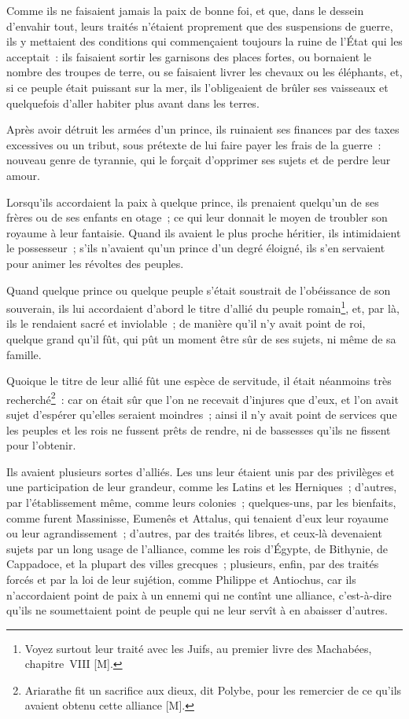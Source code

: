 \documentclass[french,twoside]{book} %
\begin{document}
Comme ils ne faisaient jamais la paix de bonne foi, et que, dans le dessein d’envahir tout, leurs traités n’étaient proprement que des suspensions de guerre, ils y mettaient des conditions qui commençaient toujours la ruine de l’État qui les acceptait : ils faisaient sortir les garnisons des places fortes, ou bornaient le nombre des troupes de terre, ou se faisaient livrer les chevaux ou les éléphants, et, si ce peuple était puissant sur la mer, ils l’obligeaient de brûler ses vaisseaux et quelquefois d’aller habiter plus avant dans les terres.\par
Après avoir détruit les armées d’un prince, ils ruinaient ses finances par des taxes excessives ou un tribut, sous prétexte de lui faire payer les frais de la guerre : nouveau genre de tyrannie, qui le forçait d’opprimer ses sujets et de perdre leur amour.\par
Lorsqu’ils accordaient la paix à quelque prince, ils prenaient quelqu’un de ses frères ou de ses enfants en otage ; ce qui leur donnait le moyen de troubler son royaume à leur fantaisie. Quand ils avaient le plus proche héritier, ils intimidaient le possesseur ; s’ils n’avaient qu’un prince d’un degré éloigné, ils s’en servaient pour animer les révoltes des peuples.\par
Quand quelque prince ou quelque peuple s’était soustrait de l’obéissance de son souverain, ils lui accordaient d’abord le titre d’allié du peuple romain\footnote{Voyez surtout leur traité avec les Juifs, au premier livre des Machabées, chapitre VIII [M].}, et, par là, ils le rendaient sacré et inviolable ; de manière qu’il n’y avait point de roi, quelque grand qu’il fût, qui pût un moment être sûr de ses sujets, ni même de sa famille.\par
Quoique le titre de leur allié fût une espèce de servitude, il était néanmoins très recherché\footnote{Ariarathe fit un sacrifice aux dieux, dit Polybe, pour les remercier de ce qu’ils avaient obtenu cette alliance [M].} : car on était sûr que l’on ne recevait d’injures que d’eux, et l’on avait sujet d’espérer qu’elles seraient moindres ; ainsi il n’y avait point de services que les peuples et les rois ne fussent prêts de rendre, ni de bassesses qu’ils ne fissent pour l’obtenir.\par
Ils avaient plusieurs sortes d’alliés. Les uns leur étaient unis par des privilèges et une participation de leur grandeur, comme les Latins et les Herniques ; d’autres, par l’établissement même, comme leurs colonies ; quelques-uns, par les bienfaits, comme furent Massinisse, Eumenês et Attalus, qui tenaient d’eux leur royaume ou leur agrandissement ; d’autres, par des traités libres, et ceux-là devenaient sujets par un long usage de l’alliance, comme les rois d’Égypte, de Bithynie, de Cappadoce, et la plupart des villes grecques ; plusieurs, enfin, par des traités forcés et par la loi de leur sujétion, comme Philippe et Antiochus, car ils n’accordaient point de paix à un ennemi qui ne contînt une alliance, c’est-à-dire qu’ils ne soumettaient point de peuple qui ne leur servît à en abaisser d’autres.\par
\end{document}
